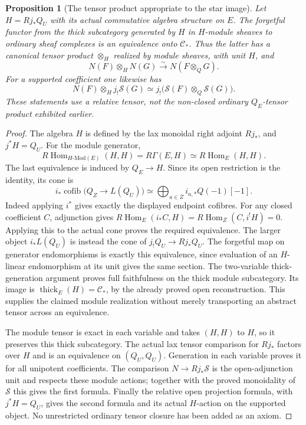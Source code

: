 \documentclass[11pt]{article}
\newtheorem{proposition}[theorem]{Proposition}
\theoremstyle{definition}
\theoremstyle{remark}
\newcommand{\RHom}{R\operatorname{Hom}}
\newcommand{\thick}{\operatorname{thick}}
\begin{document}
\begin{proposition}[The tensor product appropriate to the star image]
\label{prop:relative-star-tensor}
Let $H=Rj_*Q_U$ with its actual commutative algebra structure on $E$.
The forgetful functor from the thick subcategory generated by $H$ in
$H$-module sheaves to ordinary sheaf complexes is an equivalence onto
$\mathcal C_*$.  Thus the latter has a canonical tensor product
$\otimes_H$ realized by module sheaves, with unit $H$, and
\[
 N(F)\otimes_H N(G)\xrightarrow{\sim}N(F\otimes_Q G).
\]
For a supported coefficient one likewise has
\[
 N(F)\otimes_H j_!\mathcal S(G)
       \simeq j_!\bigl(\mathcal S(F)\otimes_Q\mathcal S(G)\bigr).
\]
These statements use a relative tensor, not the non-closed ordinary
$Q_E$-tensor product exhibited earlier.
\end{proposition}
\begin{proof}
The algebra $H$ is defined by the lax monoidal right adjoint $Rj_*$,
and $j^*H=Q_U$.  For the module generator,
\[
 \RHom_{H\text{-}\mathrm{Mod}(E)}(H,H)=R\Gamma(E,H)
      \simeq\RHom_E(H,H).
\]
The last equivalence is induced by $Q_E\to H$.  Since its open
restriction is the identity, its cone is
\[
 i_*\operatorname{cofib}\bigl(Q_Z\longrightarrow L(Q_U)\bigr)
       \simeq \bigoplus_{a\in Z}i_{a,*}Q(-1)[-1].
\]
Indeed applying $i^*$ gives exactly the displayed endpoint cofibres.
For any closed coefficient $C$, adjunction gives
$\RHom_E(i_*C,H)=\RHom_Z(C,i^!H)=0$.  Applying this to the actual
cone proves the required equivalence.  The larger object $i_*L(Q_U)$
is instead the cone of $j_!Q_U\to Rj_*Q_U$.
The forgetful map on generator endomorphisms is exactly this
equivalence, since evaluation of an $H$-linear endomorphism at its
unit gives the same section.  The two-variable thick-generation
argument proves full faithfulness on the thick module subcategory.
Its image is $\thick_E(H)=\mathcal C_*$, by the already proved
open reconstruction.  This supplies the claimed module realization
without merely transporting an abstract tensor across an equivalence.

The module tensor is exact in each variable and takes $(H,H)$ to
$H$, so it preserves this thick subcategory.  The actual lax tensor
comparison for $Rj_*$ factors over $H$ and is an equivalence on
$(Q_U,Q_U)$.  Generation in each variable proves it for all unipotent
coefficients.  The comparison $N\to Rj_*\mathcal S$ is the
open-adjunction unit and respects these module actions; together with
the proved monoidality of $\mathcal S$ this gives the first formula.
Finally the relative open projection formula, with $j^*H=Q_U$, gives
the second formula and its actual $H$-action on the supported object.
No unrestricted ordinary tensor closure has been added as an axiom.
\end{proof}
\end{document}
